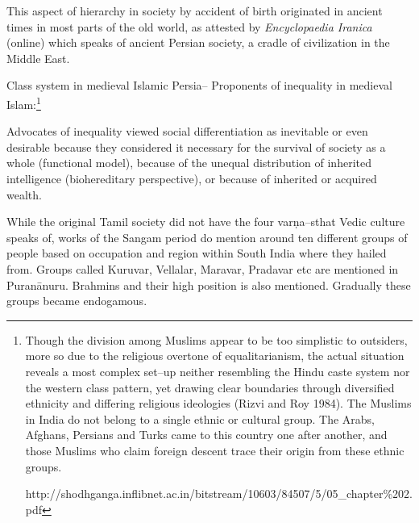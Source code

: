 This aspect of hierarchy in society by accident of birth originated in ancient times in most parts of the old world, as attested by \textit{Encyclopaedia Iranica} (online) which speaks of ancient Persian society, a cradle of civilization in the Middle East.

\begin{myquote}
Class system in medieval Islamic Persia– Proponents of inequality in medieval Islam:\footnote{Though the division among Muslims appear to be too simplistic to outsiders, more so due to the religious overtone of equalitarianism, the actual situation reveals a most complex set–up neither resembling the Hindu caste system nor the western class pattern, yet drawing clear boundaries through diversified ethnicity and differing religious ideologies (Rizvi and Roy 1984). The Muslims in India do not belong to a single ethnic or cultural group. The Arabs, Afghans, Persians and Turks came to this country one after another, and those Muslims who claim foreign descent trace their origin from these ethnic groups.

http://shodhganga.inflibnet.ac.in/bitstream/10603/84507/5/05\_chapter\%202.pdf}
\end{myquote}

\newpage

\begin{myquote}
Advocates of inequality viewed social differentiation as inevitable or even desirable because they considered it necessary for the survival of society as a whole (functional model), because of the unequal distribution of inherited intelligence (biohereditary perspective), or because of inherited or acquired wealth.
\end{myquote}

\vskip 2pt

While the original Tamil society did not have the four varņa–s\break that Vedic culture speaks of, works of the Sangam period do mention around ten different groups of people based on occupation and region within South India where they hailed from. Groups called Kuruvar, Vellalar, Maravar, Pradavar etc are mentioned in Puranānuru. Brahmins and their high position is also mentioned. Gradually these groups became endogamous.

\vskip 2pt

